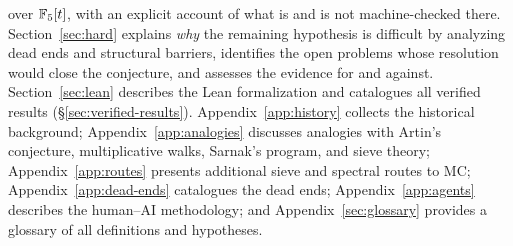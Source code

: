 over $\mathbb{F}_5[t]$, with an explicit account of what is and is not
machine-checked there.
Section~\ref{sec:hard} explains \emph{why} the remaining hypothesis is
difficult by analyzing dead ends and structural barriers, identifies
the open problems whose resolution would close the conjecture, and
assesses the evidence for and against.
Section~\ref{sec:lean} describes the Lean formalization and
catalogues all verified results (\S\ref{sec:verified-results}).
Appendix~\ref{app:history} collects the historical background;
Appendix~\ref{app:analogies} discusses analogies with
Artin's conjecture, multiplicative walks, Sarnak's program, and
sieve theory;
Appendix~\ref{app:routes} presents additional sieve and spectral routes to MC;
Appendix~\ref{app:dead-ends} catalogues the dead ends;
Appendix~\ref{app:agents} describes the human--AI methodology;
and Appendix~\ref{sec:glossary} provides a glossary of all definitions and hypotheses.

